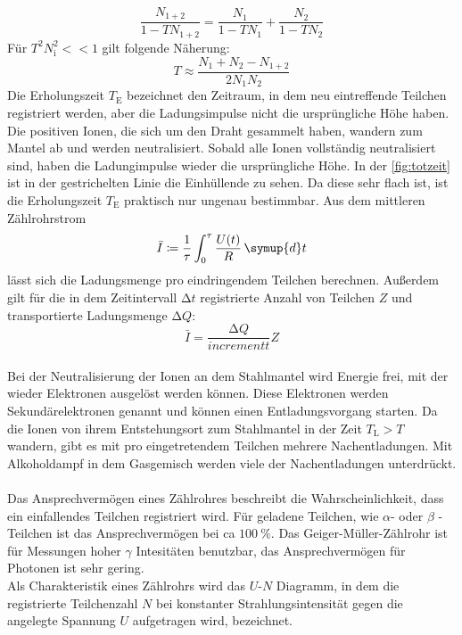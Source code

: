 \begin{equation*}
    \frac{N_{1+2}}{1-TN_{1+2}} = \frac{N_1}{1-TN_1}+\frac{N_2}{1-TN_2}
\end{equation*}
Für $T^2N_{\text{i}}^2 <<1$ gilt folgende Näherung:
\begin{equation*}
    T \approx \frac{N_1 + N_2 - N_{1+2}}{2N_1N_2}
\end{equation*}
Die Erholungszeit $T_{\text{E}}$ bezeichnet den Zeitraum, in dem neu eintreffende Teilchen registriert werden, aber die Ladungsimpulse nicht die ursprüngliche Höhe haben.
Die positiven Ionen, die sich um den Draht gesammelt haben, wandern zum Mantel ab und werden neutralisiert.
Sobald alle Ionen vollständig neutralisiert sind, haben die Ladungimpulse wieder die ursprüngliche Höhe.
In der \autoref{fig:totzeit} ist in der gestrichelten Linie die Einhüllende zu sehen.
Da diese sehr flach ist, ist die Erholungszeit $T_{\text{E}}$ praktisch nur ungenau bestimmbar.
Aus dem mittleren Zählrohrstrom 
 \begin{equation*}
     \bar{I} \coloneq \frac{1}{\tau} \int_0^{\tau} \frac{U(t)}{R}\,\symup{d}t
 \end{equation*} 
 lässt sich die Ladungsmenge pro eindringendem Teilchen berechnen.
 Außerdem gilt für die in dem Zeitintervall $\increment t$ registrierte Anzahl von Teilchen $Z$ und transportierte Ladungsmenge $\increment Q$:
 \begin{equation*}
     \bar{I} = \frac{\increment Q}{increment t} Z
 \end{equation*}\\
Bei der Neutralisierung der Ionen an dem Stahlmantel wird Energie frei, mit der wieder Elektronen ausgelöst werden können.
Diese Elektronen werden Sekundärelektronen genannt und können einen Entladungsvorgang starten.
Da die Ionen von ihrem Entstehungsort zum Stahlmantel in der Zeit $T_{\text{L}}>T$ wandern, gibt es mit pro eingetretendem Teilchen mehrere Nachentladungen.
Mit Alkoholdampf in dem Gasgemisch werden viele der Nachentladungen unterdrückt.\\
\\
Das Ansprechvermögen eines Zählrohres beschreibt die Wahrscheinlichkeit, dass ein einfallendes Teilchen registriert wird.
Für geladene Teilchen, wie $\alpha$- oder $\beta $ -Teilchen ist das Ansprechvermögen bei ca $\SI{100}{\percent}$.
Das Geiger-Müller-Zählrohr ist für Messungen hoher $\gamma$ Intesitäten benutzbar, das Ansprechvermögen für Photonen ist sehr gering.\\
Als Charakteristik eines Zählrohrs wird das $U$-$N$ Diagramm, in dem die registrierte Teilchenzahl $N$ bei konstanter Strahlungsintensität gegen die angelegte Spannung $U$ aufgetragen wird, bezeichnet.
